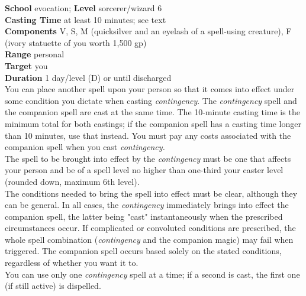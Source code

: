 \textbf{School} evocation; \textbf{Level} sorcerer/wizard 6\\
\textbf{Casting Time} at least 10 minutes; see text\\
\textbf{Components} V, S, M (quicksilver and an eyelash of a spell-using creature), F (ivory statuette of you worth 1,500 gp)\\
\textbf{Range} personal\\
\textbf{Target} you\\
\textbf{Duration} 1 day/level (D) or until discharged\\
You can place another spell upon your person so that it comes into effect under some condition you dictate when casting \textit{contingency}. The \textit{contingency }spell and the companion spell are cast at the same time. The 10-minute casting time is the minimum total for both castings; if the companion spell has a casting time longer than 10 minutes, use that instead. You must pay any costs associated with the companion spell when you cast \textit{contingency.}\\
The spell to be brought into effect by the \textit{contingency }must be one that affects your person and be of a spell level no higher than one-third your caster level (rounded down, maximum 6th level).\\
The conditions needed to bring the spell into effect must be clear, although they can be general. In all cases, the \textit{contingency }immediately brings into effect the companion spell, the latter being "cast" instantaneously when the prescribed circumstances occur. If complicated or convoluted conditions are prescribed, the whole spell combination (\textit{contingency }and the companion magic) may fail when triggered. The companion spell occurs based solely on the stated conditions, regardless of whether you want it to.\\
You can use only one \textit{contingency }spell at a time; if a second is cast, the first one (if still active) is dispelled.\\
